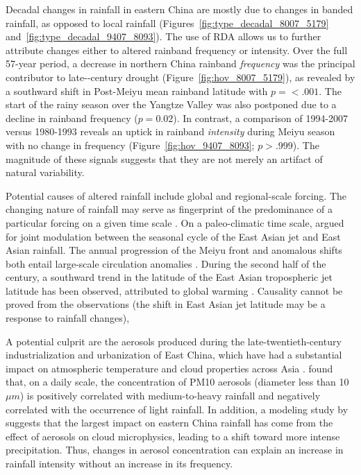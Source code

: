\documentclass[9pt,twocolumn,twoside,lineno]{pnas-new}
\begin{document}
	Decadal changes in rainfall in eastern China are mostly due to changes in banded rainfall, as opposed to local rainfall (Figures~\ref{fig:type_decadal_8007_5179} and~\ref{fig:type_decadal_9407_8093}). The use of RDA allows us to further attribute changes either to altered rainband frequency or intensity. Over the full 57-year period, a decrease in northern China rainband \textit{frequency} was the principal contributor to late--century drought (Figure~\ref{fig:hov_8007_5179}), as revealed by a southward shift in Post-Meiyu mean rainband latitude with $p=<.001$. The start of the rainy season over the Yangtze Valley was also postponed due to a decline in rainband frequency ($p=0.02$). In contrast, a comparison of 1994-2007 versus 1980-1993 reveals an uptick in rainband \textit{intensity} during Meiyu season with no change in frequency (Figure~\ref{fig:hov_9407_8093}; $p>.999$). The magnitude of these signals suggests that they are not merely an artifact of natural variability.
	 
	 Potential causes of altered rainfall include global and regional-scale forcing. The changing nature of rainfall may serve as fingerprint of the predominance of a particular forcing on a given time scale . On a paleo-climatic time scale, \citet{Chiang2015} argued for joint modulation between the seasonal cycle of the East Asian jet and East Asian rainfall. The annual progression of the Meiyu front and anomalous shifts both entail large-scale circulation anomalies \citep{Chen2004,Kosaka2011}. During the second half of the  century, a southward trend in the latitude of the East Asian tropospheric jet latitude has been observed, attributed to global warming \citep{Yu2007, Archer2008,Park2014a}. Causality cannot be proved from the observations (the shift in East Asian jet latitude may be a response to rainfall changes), 
	 
A potential culprit are the aerosols produced during the late-twentieth-century industrialization and urbanization of East China, which have had a substantial impact on atmospheric temperature and cloud properties across Asia \citep{Menon2002,Fan2012,Streets2013}. \citet{Choi2008} found that, on a daily scale, the concentration of PM10 aerosols (diameter less than 10 $\mu m$) is positively correlated with medium-to-heavy rainfall and negatively correlated with the occurrence of light rainfall. In addition, a modeling study by \citet{Wang2016} suggests that the largest impact on eastern China rainfall has come from the effect of aerosols on cloud microphysics, leading to a shift toward more intense precipitation. Thus, changes in aerosol concentration can explain an increase in rainfall intensity without an increase in its frequency.
	
\end{document}

